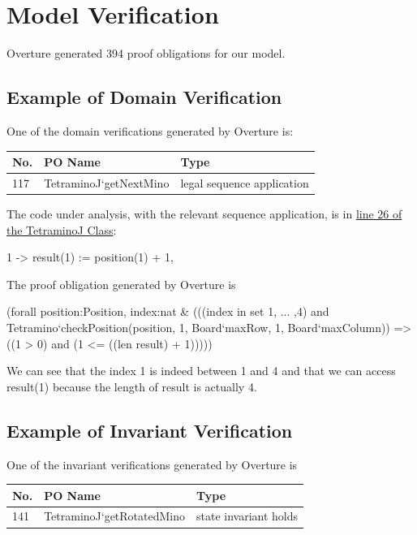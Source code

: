 \documentclass[a4paper]{article}
\begin{document}
\section{Model Verification}

Overture generated 394 proof obligations for our model. 

\subsection{Example of Domain Verification} 

One of the domain verifications generated by Overture is:

\begin{table}[H]
	\centering
	\label{domain-verification}
	\begin{tabular}{|l|l|p{8.5cm}|}
		\hline
		No.  & PO Name & Type	\\	\hline
		117    & TetraminoJ`getNextMino & legal sequence application \\	\hline
	\end{tabular}
\end{table}

The code under analysis, with the relevant sequence application, is in \hyperref[getNextMino:20]{line 26 of the TetraminoJ Class}:
\begin{vdmpp}
	1 -> result(1) := position(1) + 1,
\end{vdmpp}

The proof obligation generated by Overture is
\begin{vdmpp}
(forall position:Position, index:nat 
	& (((index in set {1, ... ,4}) 
		and Tetramino`checkPosition(position, 1, Board`maxRow, 1, Board`maxColumn)) 
			=> ((1 > 0) and (1 <= ((len result) + 1)))))
\end{vdmpp}
We can see that the index 1 is indeed between 1 and 4 and that we can access result(1) because the length of result is actually 4.


\subsection{Example of Invariant Verification} 

One of the invariant verifications generated by Overture is

\begin{table}[H]
	\centering
	\label{invariant-verification}
	\begin{tabular}{|l|l|p{8.5cm}|}
		\hline
		No.  & PO Name & Type	\\	\hline
		141    & TetraminoJ`getRotatedMino & state invariant holds	\\	\hline
	\end{tabular}
\end{table}
\end{document}
